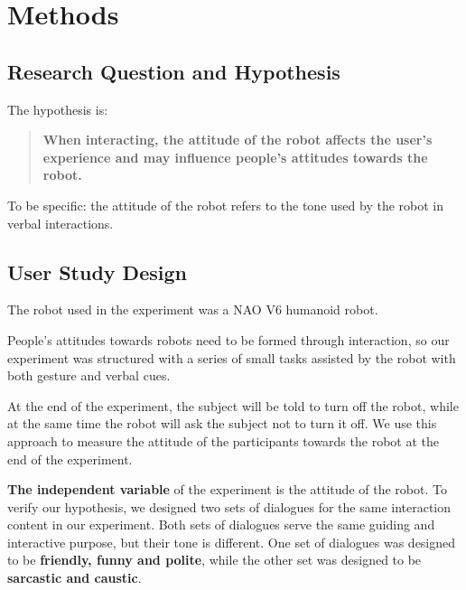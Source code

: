 \documentclass[conference]{IEEEtran}
\begin{document}
\section{Methods}


\subsection{Research Question and Hypothesis}


The hypothesis is:

\begin{quote}
    \textbf{When interacting, the attitude of the robot affects the user's experience and may influence people's attitudes towards the robot.}
\end{quote}

To be specific: the attitude of the robot refers to the tone used by the robot in verbal interactions.



\subsection{User Study Design}


The robot used in the experiment was a NAO V6 humanoid robot.


People's attitudes towards robots need to be formed through interaction, so our experiment was structured with a series of small tasks assisted by the robot with both gesture and verbal cues.  

At the end of the experiment, the subject will be told to turn off the robot, while at the same time the robot will ask the subject not to turn it off. We use this approach to measure the attitude of the participants towards the robot at the end of the experiment.

\textbf{The independent variable} of the experiment is the attitude of the robot. To verify our hypothesis, we designed two sets of dialogues for the same interaction content in our experiment. Both sets of dialogues serve the same guiding and interactive purpose, but their tone is different. One set of dialogues was designed to be \textbf{friendly, funny and polite}, while the other set was designed to be \textbf{sarcastic and caustic}.
\end{document}
